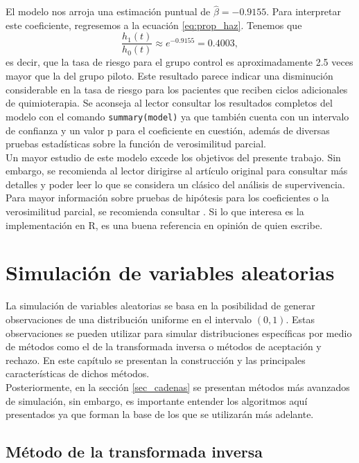 \documentclass[11pt,a4paper]{article}
\begin{document}
El modelo nos arroja una estimación puntual de $\hat{\beta} = -0.9155$. Para interpretar este coeficiente, regresemos a la ecuación \ref{eq:prop_haz}. Tenemos que $$\frac{h_1(t)}{h_0(t)} \approx e^{-0.9155} = 0.4003,$$ es decir, que la tasa de riesgo para el grupo control es aproximadamente 2.5 veces mayor que la del grupo piloto. Este resultado parece indicar una disminución considerable en la tasa de riesgo para los pacientes que reciben ciclos adicionales de quimioterapia. Se aconseja al lector consultar los resultados completos del modelo con el comando \texttt{summary(model)} ya que también cuenta con un intervalo de confianza y un valor p para el coeficiente en cuestión, además de diversas pruebas estadísticas sobre la función de verosimilitud parcial.\\

Un mayor estudio de este modelo excede los objetivos del presente trabajo. Sin embargo, se recomienda al lector dirigirse al artículo original para consultar más detalles y poder leer lo que se considera un clásico del análisis de supervivencia. Para mayor información sobre pruebas de hipótesis para los coeficientes o la verosimilitud parcial, se recomienda consultar \citet{klein}. Si lo que interesa es la implementación en R, \citet{moore} es una buena referencia en opinión de quien escribe.

\newpage

\section{Simulación de variables aleatorias}
\label{simulacion}

La simulación de variables aleatorias se basa en la posibilidad de generar observaciones de una distribución uniforme en el intervalo $(0, 1)$. Estas observaciones se pueden utilizar para simular distribuciones específicas por medio de métodos como el de la transformada inversa o métodos de aceptación y rechazo. En este capítulo se presentan la construcción y las principales características de dichos métodos.\\

Posteriormente, en la sección \ref{sec_cadenas} se presentan métodos más avanzados de simulación, sin embargo, es importante entender los algoritmos aquí presentados ya que forman la base de los que se utilizarán más adelante.

\subsection{Método de la transformada inversa}
\label{sec:transformada}
\end{document}

